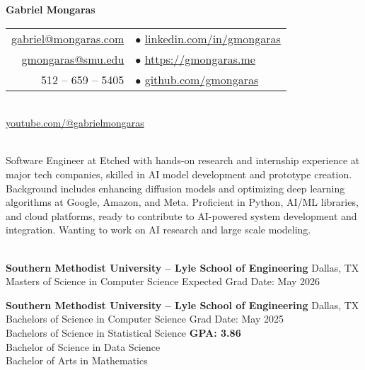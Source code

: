 \documentclass[a4paper,10pt]{article}
\begin{document}
\begin{center}
    {\LARGE \textbf{Gabriel Mongaras}} \\
    \vspace{10pt}
    \begin{tabular}{r l}
        \href{mailto:gabriel@mongaras.com}{gabriel@mongaras.com} \quad & $\bullet$ \quad \href{https://www.linkedin.com/in/gmongaras}{linkedin.com/in/gmongaras} \\
        \href{mailto:gmongaras@smu.edu}{gmongaras@smu.edu} \quad & $\bullet$ \quad \href{https://gmongaras.me/}{https://gmongaras.me} \\
        512 – 659 – 5405 \quad & $\bullet$ \quad \href{https://github.com/gmongaras}{github.com/gmongaras} \\
    \end{tabular} \\
    \href{https://www.youtube.com/@gabrielmongaras}{youtube.com/@gabrielmongaras} \\
\end{center}

\noindent\hrulefill

 \vspace{1pt} \\
Software Engineer at Etched with hands-on research and internship experience at major tech companies, skilled in AI model development and prototype creation. Background includes enhancing diffusion models and optimizing deep learning algorithms at Google, Amazon, and Meta. Proficient in Python, AI/ML libraries, and cloud platforms, ready to contribute to AI-powered system development and integration. Wanting to work on AI research and large scale modeling.

\vspace{5pt}
 \vspace{1pt} \\
\textbf{Southern Methodist University – Lyle School of Engineering} \hfill Dallas, TX \\
Masters of Science in Computer Science \hfill Expected Grad Date: May 2026

\vspace{5pt}
\noindent\textbf{Southern Methodist University – Lyle School of Engineering} \hfill Dallas, TX \\
Bachelors of Science in Computer Science \hfill Grad Date: May 2025 \\
Bachelors of Science in Statistical Science \hfill \textbf{GPA: 3.86} \\
Bachelor of Science in Data Science \\
Bachelor of Arts in Mathematics
\end{document}
